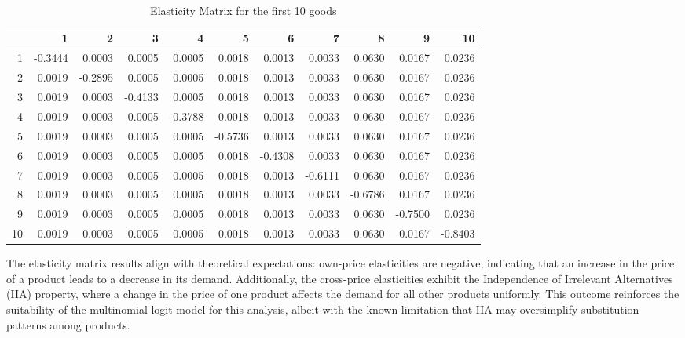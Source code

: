 \documentclass[
]{article}
\begin{document}
\begin{table}[h!]
\centering
\begin{tabular}{r|rrrrrrrrrr}
        & 1           & 2           & 3           & 4           & 5           & 6           & 7           & 8           & 9           & 10          \\
\hline
1   & -0.3444  & 0.0003   & 0.0005   & 0.0005   & 0.0018   & 0.0013   & 0.0033   & 0.0630   & 0.0167   & 0.0236 \\
2   & 0.0019   & -0.2895  & 0.0005   & 0.0005   & 0.0018   & 0.0013   & 0.0033   & 0.0630   & 0.0167   & 0.0236 \\
3   & 0.0019   & 0.0003   & -0.4133  & 0.0005   & 0.0018   & 0.0013   & 0.0033   & 0.0630   & 0.0167   & 0.0236 \\
4   & 0.0019   & 0.0003   & 0.0005   & -0.3788  & 0.0018   & 0.0013   & 0.0033   & 0.0630   & 0.0167   & 0.0236 \\
5   & 0.0019   & 0.0003   & 0.0005   & 0.0005   & -0.5736  & 0.0013   & 0.0033   & 0.0630   & 0.0167   & 0.0236 \\
6   & 0.0019   & 0.0003   & 0.0005   & 0.0005   & 0.0018   & -0.4308  & 0.0033   & 0.0630   & 0.0167   & 0.0236 \\
7   & 0.0019   & 0.0003   & 0.0005   & 0.0005   & 0.0018   & 0.0013   & -0.6111  & 0.0630   & 0.0167   & 0.0236 \\
8   & 0.0019   & 0.0003   & 0.0005   & 0.0005   & 0.0018   & 0.0013   & 0.0033   & -0.6786  & 0.0167   & 0.0236 \\
9   & 0.0019   & 0.0003   & 0.0005   & 0.0005   & 0.0018   & 0.0013   & 0.0033   & 0.0630   & -0.7500  & 0.0236 \\
10  & 0.0019   & 0.0003   & 0.0005   & 0.0005   & 0.0018   & 0.0013   & 0.0033   & 0.0630   & 0.0167   & -0.8403 \\
\end{tabular}
\caption{Elasticity Matrix for the first 10 goods}
\end{table}

The elasticity matrix results align with theoretical expectations: own-price elasticities are negative, indicating that an increase in the price of a product leads to a decrease in its demand. Additionally, the cross-price elasticities exhibit the Independence of Irrelevant Alternatives (IIA) property, where a change in the price of one product affects the demand for all other products uniformly. This outcome reinforces the suitability of the multinomial logit model for this analysis, albeit with the known limitation that IIA may oversimplify substitution patterns among products.
\end{document}
